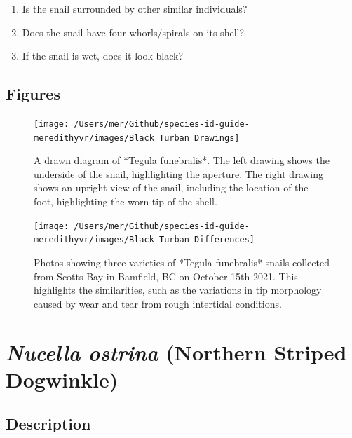 \documentclass[
]{article}
\begin{document}
\begin{enumerate}
\def\labelenumi{\arabic{enumi})}
\item
  Is the snail surrounded by other similar individuals?
\item
  Does the snail have four whorls/spirals on its shell?
\item
  If the snail is wet, does it look black?
\end{enumerate}

\newpage

\hypertarget{figures-2}{%
\subsection{Figures}\label{figures-2}}

\begin{figure}

\texttt{[image: /Users/mer/Github/species-id-guide-meredithyvr/images/Black Turban Drawings]} \hfill{}

\caption{A drawn diagram of *Tegula funebralis*. The left drawing shows the underside of the snail, highlighting the aperture. The right drawing shows an upright view of the snail, including the location of the foot, highlighting the worn tip of the shell.}\label{fig:Black_Turban_Drawing}
\end{figure}

\begin{figure}

\texttt{[image: /Users/mer/Github/species-id-guide-meredithyvr/images/Black Turban Differences]} \hfill{}

\caption{Photos showing three varieties of *Tegula funebralis* snails collected from Scotts Bay in Bamfield, BC on October 15th 2021. This highlights the similarities, such as the variations in tip morphology caused by wear and tear from rough intertidal conditions.}\label{fig:Black_Turban_Differences}
\end{figure}

\newpage

\hypertarget{nucella-ostrina-northern-striped-dogwinkle}{%
\section{\texorpdfstring{\emph{Nucella ostrina} (Northern Striped
Dogwinkle)}{Nucella ostrina (Northern Striped Dogwinkle)}}\label{nucella-ostrina-northern-striped-dogwinkle}}

\hypertarget{description-3}{%
\subsection{Description}\label{description-3}}
\end{document}
